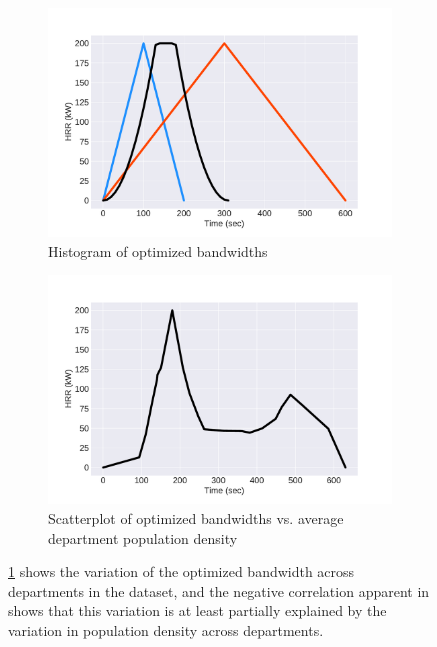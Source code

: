 \documentclass{article}
\begin{document}
\begin{figure}[htbp]
  \centering
  \begin{subfigure}[t]{.45\textwidth}
      \centering
      \includegraphics[width=\textwidth,keepaspectratio]{figures/training_ramps.pdf}
      \caption{Histogram of optimized bandwidths}
      \label{fig:bhist}
  \end{subfigure}
  \begin{subfigure}[t]{.45\textwidth}
      \centering
      \includegraphics[width=\textwidth ,keepaspectratio]{figures/test_ramp.pdf}
      \caption{Scatterplot of optimized bandwidths vs. average department population density}
      \label{fig:popband}
  \end{subfigure}
  \caption{\protect\ref{fig:bhist} shows the variation of the optimized bandwidth across departments in the dataset, and the negative correlation apparent in \protect{} shows that this variation is at least partially explained by the variation in population density across departments.}
  \label{fig:band_optimization}
\end{figure}
\end{document}
